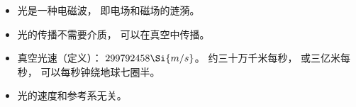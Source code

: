 
\begin{issues}
\issueDraft
\end{issues}

\begin{itemize}
\item 光是一种电磁波， 即电场和磁场的涟漪。
\item 光的传播不需要介质， 可以在真空中传播。
\item 真空光速（定义）： $299792458\Si{m/s}$。 约三十万千米每秒， 或三亿米每秒， 可以每秒钟绕地球七圈半。
\item 光的速度和参考系无关。
\end{itemize}
